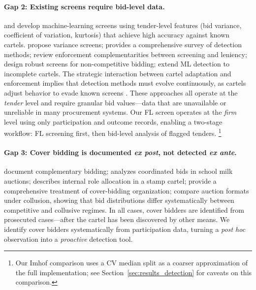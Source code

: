 \paragraph{Gap 2: Existing screens require bid-level data.}
\citet{imhof2019detecting} and \citet{imhof2018screening} develop
machine-learning screens using tender-level features (bid variance,
coefficient of variation, kurtosis) that achieve high accuracy against
known cartels. \citet{abrantesmetz2006a} propose variance screens;
\citet{harrington2008detecting} provides a comprehensive survey of
detection methods; \citet{hüschelrath2014cartel} review enforcement
complementarities between screening and leniency;
\citet{chassang2022robust} design robust screens for non-competitive
bidding; \citet{wallimann2023machine} extend ML detection to incomplete
cartels. The strategic interaction between cartel adaptation and
enforcement implies that detection methods must evolve continuously,
as cartels adjust behavior to evade known screens
\citep{harrington2008detecting}.
These approaches all operate at the \emph{tender} level and
require granular bid values---data that are unavailable or unreliable
in many procurement systems. Our FL screen operates at the \emph{firm}
level using only participation and outcome records, enabling a
two-stage workflow: FL screening first, then bid-level analysis of
flagged tenders.%
\footnote{Our Imhof comparison uses a CV median split as a coarser
approximation of the full \citet{imhof2019detecting} implementation;
see Section~\ref{sec:results_detection} for caveats on this
comparison.}

\paragraph{Gap 3: Cover bidding is documented \emph{ex post}, not
detected \emph{ex ante}.}
\citet{porter1999ohio} document complementary bidding;
\citet{pesendorfer2000study} analyzes coordinated bids in school milk
auctions; \citet{asker2010leniency} describes internal role allocation
in a stamp cartel; \citet{marshall2012economics} provide a
comprehensive treatment of cover-bidding organization;
\citet{athey2011comparing} compare auction formats under collusion,
showing that bid distributions differ systematically between
competitive and collusive regimes. In all cases,
cover bidders are identified from prosecuted cases---after the cartel
has been discovered by other means. We identify cover bidders
systematically from participation data, turning a \emph{post hoc}
observation into a \emph{proactive} detection tool.


